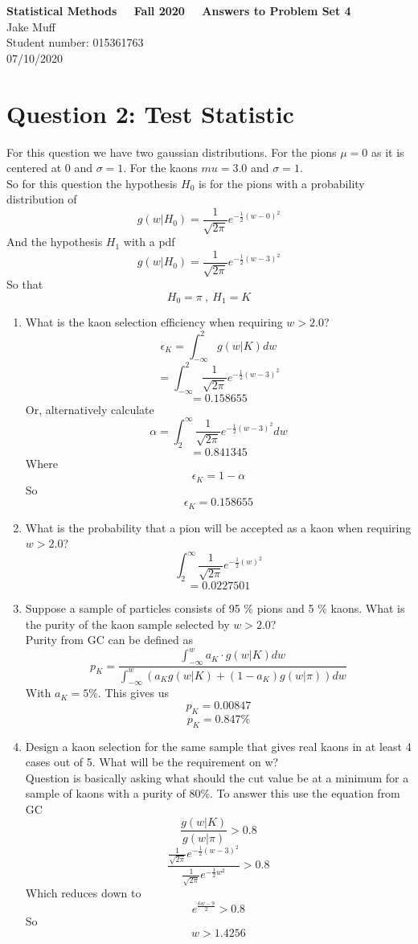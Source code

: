 \documentclass[12pt]{article}
\begin{document}
\normalsize

\baselineskip 14pt

\begin{center}
{\Large {\bf Statistical Methods \ \ Fall 2020 \ \  Answers to Problem Set 4}}\\
{\large { Jake Muff}}\\
{Student number: 015361763}\\
{07/10/2020}
\end{center}

\section{Question 2: Test Statistic}
For this question we have two gaussian distributions. For the pions $\mu = 0$ as it is centered at 0 and $\sigma = 1$. For the kaons $mu = 3.0$ and $\sigma = 1$. \\
So for this question the hypothesis $H_0$ is for the pions with a probability distribution of 
$$ g(w | H_0) = \frac{1}{\sqrt{2 \pi}} e^{-\frac{1}{2}(w-0)^2} $$
And the hypothesis $H_1$ with a pdf 
$$ g(w | H_0) = \frac{1}{\sqrt{2 \pi}} e^{-\frac{1}{2}(w-3)^2} $$
So that 
$$ H_0 = \pi \ , \ H_1 = K $$
\begin{enumerate}
    \item What is the kaon selection efficiency when requiring $w > 2.0$? \\
    $$ \epsilon_K = \int_{- \infty}^2 g(w | K) dw $$
    $$ = \int_{- \infty}^2 \frac{1}{\sqrt{2 \pi}} e^{- \frac{1}{2}(w-3)^2} $$
    $$ = 0.158655 $$
    Or, alternatively calculate 
    $$ \alpha = \int_2^{\infty} \frac{1}{\sqrt{2 \pi}} e^{-\frac{1}{2}(w-3)^2} dw $$
    $$ = 0.841345 $$
    Where 
    $$ \epsilon_K = 1 - \alpha $$
    So 
    $$ \epsilon_K = 0.158655 $$

    \item What is the probability that a pion will be accepted as a kaon when requiring $w > 2.0$? 
    $$ \int_2^{\infty} \frac{1}{\sqrt{2 \pi}} e^{-\frac{1}{2} (w)^2} $$
    $$ = 0.0227501 $$

    \item Suppose a sample of particles consists of 95 \% pions and 5 \% kaons. What is the purity of the kaon sample selected by $w > 2.0$?
    \\
    Purity from GC can be defined as 
    $$ p_K = \frac{\int_{-\infty}^w a_K \cdot g(w | K) dw}{\int_{-\infty}^w (a_K g(w|K) + (1-a_K)g(w|\pi))dw} $$
    With $a_K = 5 \%$. This gives us 
    $$ p_K = 0.00847 $$
    $$ p_K = 0.847 \%$$

    \item Design a kaon selection for the same sample that gives real kaons in at least 4 cases out of 5. What will be the requirement on w?
    \\
    Question is basically asking what should the cut value be at a minimum for a sample of kaons with a purity of 80\%. To answer this use the equation from GC 
    $$ \frac{g(w|K)}{g(w|\pi)} > 0.8 $$
    $$ \frac{\frac{1}{\sqrt{2 \pi}} e^{-\frac{1}{2}(w-3)^2}}{\frac{1}{\sqrt{ 2 \pi}} e^{-\frac{1}{2} w^2}} > 0.8 $$
    Which reduces down to 
    $$ e^{\frac{6w -9}{2}} > 0.8 $$
    So 
    $$ w > 1.4256 $$
    
  
\end{enumerate}
\end{document}

